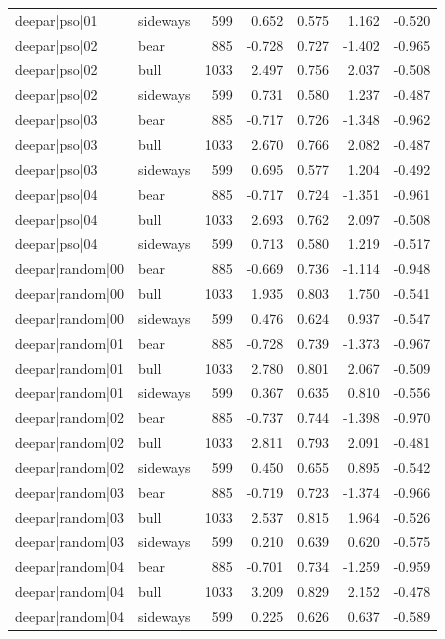 \begin{table}
\begin{tabular}{llrrrrr}
deepar|pso|01 & sideways & 599 & 0.652 & 0.575 & 1.162 & -0.520 \\
deepar|pso|02 & bear & 885 & -0.728 & 0.727 & -1.402 & -0.965 \\
deepar|pso|02 & bull & 1033 & 2.497 & 0.756 & 2.037 & -0.508 \\
deepar|pso|02 & sideways & 599 & 0.731 & 0.580 & 1.237 & -0.487 \\
deepar|pso|03 & bear & 885 & -0.717 & 0.726 & -1.348 & -0.962 \\
deepar|pso|03 & bull & 1033 & 2.670 & 0.766 & 2.082 & -0.487 \\
deepar|pso|03 & sideways & 599 & 0.695 & 0.577 & 1.204 & -0.492 \\
deepar|pso|04 & bear & 885 & -0.717 & 0.724 & -1.351 & -0.961 \\
deepar|pso|04 & bull & 1033 & 2.693 & 0.762 & 2.097 & -0.508 \\
deepar|pso|04 & sideways & 599 & 0.713 & 0.580 & 1.219 & -0.517 \\
deepar|random|00 & bear & 885 & -0.669 & 0.736 & -1.114 & -0.948 \\
deepar|random|00 & bull & 1033 & 1.935 & 0.803 & 1.750 & -0.541 \\
deepar|random|00 & sideways & 599 & 0.476 & 0.624 & 0.937 & -0.547 \\
deepar|random|01 & bear & 885 & -0.728 & 0.739 & -1.373 & -0.967 \\
deepar|random|01 & bull & 1033 & 2.780 & 0.801 & 2.067 & -0.509 \\
deepar|random|01 & sideways & 599 & 0.367 & 0.635 & 0.810 & -0.556 \\
deepar|random|02 & bear & 885 & -0.737 & 0.744 & -1.398 & -0.970 \\
deepar|random|02 & bull & 1033 & 2.811 & 0.793 & 2.091 & -0.481 \\
deepar|random|02 & sideways & 599 & 0.450 & 0.655 & 0.895 & -0.542 \\
deepar|random|03 & bear & 885 & -0.719 & 0.723 & -1.374 & -0.966 \\
deepar|random|03 & bull & 1033 & 2.537 & 0.815 & 1.964 & -0.526 \\
deepar|random|03 & sideways & 599 & 0.210 & 0.639 & 0.620 & -0.575 \\
deepar|random|04 & bear & 885 & -0.701 & 0.734 & -1.259 & -0.959 \\
deepar|random|04 & bull & 1033 & 3.209 & 0.829 & 2.152 & -0.478 \\
deepar|random|04 & sideways & 599 & 0.225 & 0.626 & 0.637 & -0.589 \\

\end{tabular}
\end{table}
